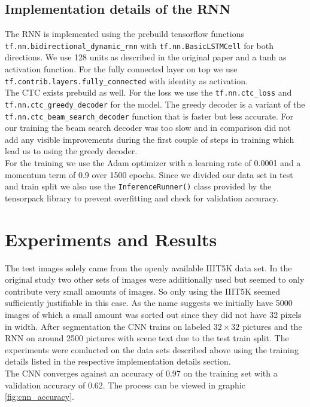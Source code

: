 \documentclass{utue} %
\begin{document}
\subsection{Implementation details of the RNN}
The RNN is implemented using the prebuild tensorflow functions \texttt{tf.nn.bidirectional\_dynamic\_rnn} with \texttt{tf.nn.BasicLSTMCell} for both directions. We use 128 units as described in the original paper and a tanh as activation function. For the fully connected layer on top we use \texttt{tf.contrib.layers.fully\_connected} with identity as activation. \\
The CTC exists prebuild as well. For the loss we use the \texttt{tf.nn.ctc\_loss} and \texttt{tf.nn.ctc\_greedy\_decoder} for the model. The greedy decoder is a variant of the \texttt{tf.nn.ctc\_beam\_search\_decoder} function that is faster but less accurate. For our training the beam search decoder was too slow and in comparison did not add any visible improvements during the first couple of steps in training which lead us to using the greedy decoder.  \\
For the training we use the Adam optimizer with a learning rate of 0.0001 and a momentum term of 0.9 over 1500 epochs. Since we divided our data set in test and train split we also use the \texttt{InferenceRunner()} class provided by the tensorpack library to prevent overfitting and check for validation accuracy. 

\section{Experiments and Results}
The test images solely came from the openly available IIIT5K data set. In the original study two other sets of images were additionally used but seemed to only contribute very small amounts of images. So only using the IIIT5K seemed sufficiently justifiable in this case. As the name suggests we initially have 5000 images of which a small amount was sorted out since they did not have 32 pixels in width. After segmentation the CNN trains on %
labeled $32\times32$ pictures and the RNN on around 2500 pictures with scene text due to the test train split. 
The experiments were conducted on the data sets described above using the training details listed in the respective implementation details section. \\
The CNN converges against an accuracy of 0.97 on the training set with a validation accuracy of 0.62. The process can be viewed in graphic  \ref{fig:cnn_accuracy}.\\
\end{document}
